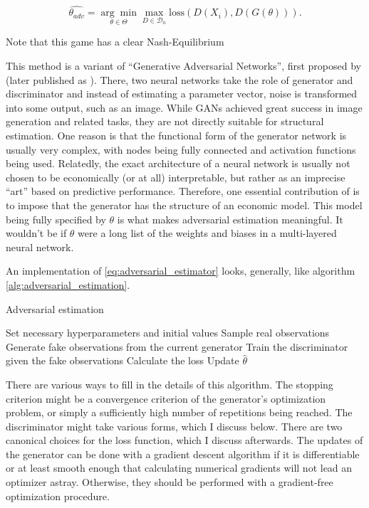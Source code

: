 \begin{equation}
\label{eq:adversarial_estimator}
    \hat{\theta_{adv}} = \underset{\theta \in \Theta}{\arg \min } \max _{D \in \mathcal{D}_n} \text{loss}(D(X_i), D(G(\theta))).
\end{equation}

Note that this game has a clear Nash-Equilibrium

This method is a variant of ``Generative Adversarial Networks'', first proposed by \textcite{goodfellow2014generative} (later published as \textcite{goodfellow2020generative}).
There, two neural networks take the role of generator and discriminator and instead of estimating a parameter vector, noise is transformed into some output, such as an image.
While GANs achieved great success in image generation and related tasks, %
they are not directly suitable for structural estimation.
One reason is that the functional form of the generator network is usually very complex, with nodes being fully connected and activation functions being used.
Relatedly, the exact architecture of a neural network is usually not chosen to be economically (or at all) interpretable, but rather as an imprecise ``art'' based on predictive performance.
Therefore, one essential contribution of \textcite{kaji2023adversarial} is to impose that the generator has the structure of an economic model.
This model being fully specified by $\theta$ is what makes adversarial estimation meaningful.
It wouldn't be if $\theta$ were a long list of the weights and biases in a multi-layered neural network.

An implementation of \ref{eq:adversarial_estimator} looks, generally, like algorithm \ref{alg:adversarial_estimation}.

\begin{algorithm}
    \caption{Adversarial estimation}
    \label{alg:adversarial_estimation}
    \begin{algorithmic}
        \STATE Set necessary hyperparameters and initial values
        \STATE Sample real observations
            \STATE Generate fake observations from the current generator
            \STATE Train the discriminator given the fake observations
            \STATE Calculate the loss
            \STATE Update $\hat{\theta}$ %
        \ENDWHILE
    \end{algorithmic}
\end{algorithm}

There are various ways to fill in the details of this algorithm.
The stopping criterion might be a convergence criterion of the generator's optimization problem, or simply a sufficiently high number of repetitions being reached.
The discriminator might take various forms, which I discuss below.
There are two canonical choices for the loss function, which I discuss afterwards.
The updates of the generator can be done with a gradient descent algorithm if it is differentiable or at least smooth enough that calculating numerical gradients will not lead an optimizer astray.
Otherwise, they should be performed with a gradient-free optimization procedure.

